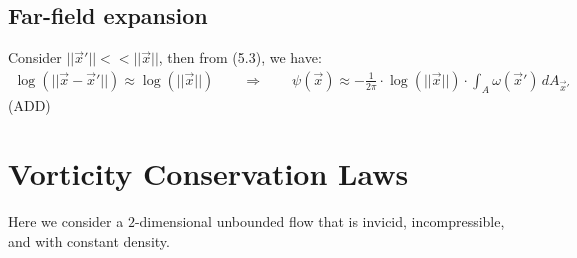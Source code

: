 \documentclass[11pt]{book}
\theoremstyle{break}
\theoremstyle{break}
\begin{document}
\subsection*{Far-field expansion}
Consider $||\vec{x}'|| << ||\vec{x}||$, then from (5.3), we have:
\begin{align*}
\log(||\vec{x} - \vec{x}'||) \approx \log(||\vec{x}||) \qquad \Rightarrow \qquad \psi(\vec{x}) \approx -\frac{1}{2\pi}\cdot \log(||\vec{x}||) \cdot \int_A \omega (\vec{x}') \, dA_{\vec{x}'} 
\end{align*}
(ADD)\\



\section[Vorticity Conservation Laws]{\color{red}Vorticity Conservation Laws\color{black}}
Here we consider a $2$-dimensional unbounded flow that is invicid, incompressible, and with constant density.\\
\end{document}
